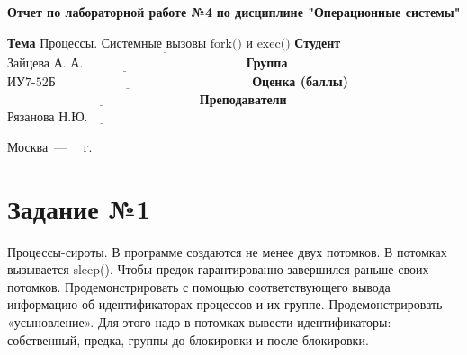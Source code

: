 \documentclass[12pt]{report}
\begin{document}
\begin{titlepage}
	
	\begin{center}
		\noindent\begin{minipage}{1.3\textwidth}\centering
			\Large\textbf{  Отчет по лабораторной работе №4}\newline
			\textbf{по дисциплине "Операционные системы"}\newline\newline
		\end{minipage}
	\end{center}
	
	\noindent\textbf{Тема} $\underline{\text{Процессы. Системные вызовы fork() и exec()}}$\newline\newline
	\noindent\textbf{Студент} $\underline{\text{Зайцева А. А.~~~~~~~~~~~~~~~~~~~~~~~~~~~~~~~~~~~~~~}}$\newline\newline
	\noindent\textbf{Группа} $\underline{\text{ИУ7-52Б~~~~~~~~~~~~~~~~~~~~~~~~~~~~~~~~~~~~~~~~~~~~~~}}$\newline\newline
	\noindent\textbf{Оценка (баллы)} $\underline{\text{~~~~~~~~~~~~~~~~~~~~~~~~~~~~~~~~~~~~~~~~~~~~~}}$\newline\newline
	\noindent\textbf{Преподаватели} $\underline{\text{Рязанова Н.Ю.~~~~~~~~~~~~~~~~~~~~~~~~~~}}$\newline\newline\newline
	
	\begin{center}
		\vfill
		Москва~---~\the\year
		~г.
	\end{center}
\end{titlepage}

\newpage

\section*{Задание №1}

Процессы-сироты. В программе создаются не менее двух потомков. В потомках вызывается sleep(). Чтобы предок гарантированно завершился раньше своих потомков. Продемонстрировать с помощью соответствующего вывода информацию об идентификаторах процессов и их группе. Продемонстрировать «усыновление». Для этого надо в потомках вывести идентификаторы: собственный, предка, группы до блокировки и после блокировки.
\end{document}
